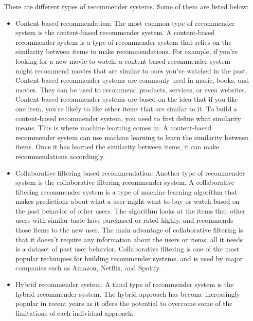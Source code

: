 \documentclass[11pt]{article}
\begin{document}
There are different types of recommender systems. Some of them are listed below:

\begin{itemize}
\item Content-based recommendation: The most common type of recommender system is the content-based recommender system. A content-based recommender system is a type of recommender system that relies on the similarity between items to make recommendations. For example, if you’re looking for a new movie to watch, a content-based recommender system might recommend movies that are similar to ones you’ve watched in the past. Content-based recommender systems are commonly used in music, books, and movies. They can be used to recommend products, services, or even websites. Content-based recommender systems are based on the idea that if you like one item, you’re likely to like other items that are similar to it. To build a content-based recommender system, you need to first define what similarity means. This is where machine learning comes in. A content-based recommender system can use machine learning to learn the similarity between items. Once it has learned the similarity between items, it can make recommendations accordingly.

\item Collaborative filtering based recommendation: 
Another type of recommender system is the collaborative filtering recommender system. A collaborative filtering recommender system is a type of machine learning algorithm that makes predictions about what a user might want to buy or watch based on the past behavior of other users. The algorithm looks at the items that other users with similar taste have purchased or rated highly, and recommends those items to the new user.
The main advantage of collaborative filtering is that it doesn’t require any information about the users or items; all it needs is a dataset of past user behavior. Collaborative filtering is one of the most popular techniques for building recommender systems, and is used by major companies such as Amazon, Netflix, and Spotify.

\item Hybrid recommender system: A third type of recommender system is the hybrid recommender system. The hybrid approach has become increasingly popular in recent years as it offers the potential to overcome some of the limitations of each individual approach.
\end{itemize}
\end{document}
